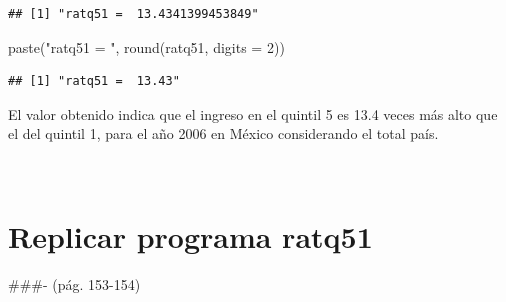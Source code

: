 \documentclass[
]{book}
\newenvironment{Shaded}{\begin{snugshade}}{\end{snugshade}}
\newcommand{\AttributeTok}[1]{\textcolor[rgb]{0.77,0.63,0.00}{#1}}
\newcommand{\ConstantTok}[1]{\textcolor[rgb]{0.00,0.00,0.00}{#1}}
\newcommand{\DecValTok}[1]{\textcolor[rgb]{0.00,0.00,0.81}{#1}}
\newcommand{\FunctionTok}[1]{\textcolor[rgb]{0.00,0.00,0.00}{#1}}
\newcommand{\NormalTok}[1]{#1}
\newcommand{\OtherTok}[1]{\textcolor[rgb]{0.56,0.35,0.01}{#1}}
\newcommand{\SpecialCharTok}[1]{\textcolor[rgb]{0.00,0.00,0.00}{#1}}
\newcommand{\StringTok}[1]{\textcolor[rgb]{0.31,0.60,0.02}{#1}}
\begin{document}
\begin{Shaded}
\end{Shaded}

\begin{verbatim}
## [1] "ratq51 =  13.4341399453849"
\end{verbatim}

\begin{Shaded}
\begin{Highlighting}[]
\FunctionTok{paste}\NormalTok{(}\StringTok{"ratq51 = "}\NormalTok{, }\FunctionTok{round}\NormalTok{(ratq51, }\AttributeTok{digits =} \DecValTok{2}\NormalTok{))}
\end{Highlighting}
\end{Shaded}

\begin{verbatim}
## [1] "ratq51 =  13.43"
\end{verbatim}

El valor obtenido indica que el ingreso en el quintil 5 es 13.4 veces más alto que el del quintil 1, para el año 2006 en México considerando el total país.

~

\hypertarget{cap-3.2}{%
\section{Replicar programa ratq51}\label{cap-3.2}}

\#\#\#- (pág. 153-154)
\end{document}
